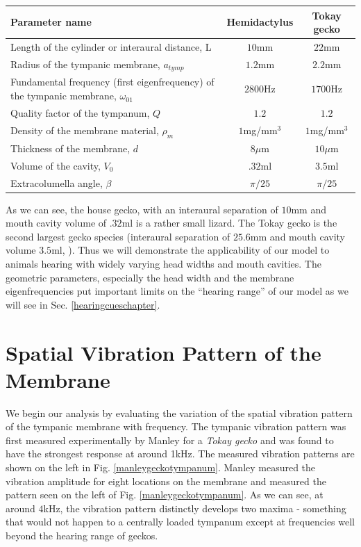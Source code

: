 \begin{minipage}{\linewidth}
\renewcommand{\arraystretch}{1.2}
\centering
{} \label{geckogeometricparams} 
\begin{tabular}{|p{8.5 cm} | c | c|}
\hline
Parameter name & Hemidactylus & Tokay gecko\\
\hline
Length of the cylinder or interaural distance, L & $10$mm & $22$mm\\
Radius of the tympanic membrane, $a_{tymp}$& $1.2$mm & $2.2$mm\\
Fundamental frequency (first eigenfrequency) of the tympanic membrane, $\omega_{01}$ & $2800$Hz & $1700$Hz\\
Quality factor of the tympanum, $Q$ & $1.2$ &  $1.2$\\
Density of the membrane material, $\rho_m$ & $1$mg/mm$^3$ & $1$mg/mm$^3$\\
Thickness of the membrane, $d$& $8\mu$m & $10\mu$m\\
Volume of the cavity, $V_0$ & $.32$ml & $3.5$ml\\ 
Extracolumella angle, $\beta$ & $\pi/25$ & $\pi/25$\\
\hline
\end {tabular}\par
\bigskip
\end{minipage}

As we can see, the house gecko, with an interaural separation of $10$mm and mouth cavity volume of $.32$ml is a rather
small lizard. The Tokay gecko is the second largest gecko species (interaural separation of $25.6$mm and mouth cavity volume $3.5$ml, \cite{dalsgaardtangcarr}).
Thus we will demonstrate the applicability of our model to animals hearing with widely varying head widths and mouth cavities. The geometric parameters, especially
the head width and the membrane eigenfrequencies put important limits on the ``hearing range'' of our model as we will see in Sec. \ref{hearingcueschapter}.

\section{Spatial Vibration Pattern of the Membrane}\label{vibrationpatternchapter}
We begin our analysis by evaluating the variation of the spatial vibration pattern of the tympanic membrane
with frequency. The tympanic vibration pattern was first measured experimentally by Manley \cite{manleygecko1}
for a \textit{Tokay gecko} and was found to have the strongest response at around 1kHz. The measured vibration patterns
are shown on the left in Fig. \ref{manleygeckotympanum}. Manley measured the vibration amplitude for eight locations on the membrane and measured the pattern
seen on the left of Fig. \ref{manleygeckotympanum}. As we can see, at around $4$kHz, the vibration pattern
distinctly develops two maxima - something that would not happen to a centrally loaded tympanum except
at frequencies well beyond the hearing range of geckos.

